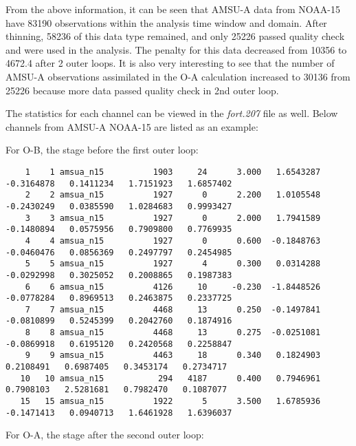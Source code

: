 From the above information, it can be seen that AMSU-A data from NOAA-15 have 83190 observations within the analysis time window and domain.  After thinning, 58236 of this data type remained, and only 25226 passed quality check and were used in the analysis.  The penalty for this data decreased from 10356 to 4672.4 after 2 outer loops. It is also very interesting to see that the number of AMSU-A observations assimilated in the O-A calculation increased to 30136  from 25226 because more data passed quality check in 2nd outer loop.
 
The statistics for each channel can be viewed in the \textit{fort.207} file as well.  Below channels from AMSU-A NOAA-15 are listed as an example:

\hspace{4ex} For O-B, the stage before the first outer loop:

\begin{scriptsize}
\begin{verbatim}
    1    1 amsua_n15          1903     24      3.000   1.6543287  -0.3164878   0.1411234   1.7151923   1.6857402
    2    2 amsua_n15          1927      0      2.200   1.0105548  -0.2430249   0.0385590   1.0284683   0.9993427
    3    3 amsua_n15          1927      0      2.000   1.7941589  -0.1480894   0.0575956   0.7909800   0.7769935
    4    4 amsua_n15          1927      0      0.600  -0.1848763  -0.0460476   0.0856369   0.2497797   0.2454985
    5    5 amsua_n15          1927      4      0.300   0.0314288  -0.0292998   0.3025052   0.2008865   0.1987383
    6    6 amsua_n15          4126     10     -0.230  -1.8448526  -0.0778284   0.8969513   0.2463875   0.2337725
    7    7 amsua_n15          4468     13      0.250  -0.1497841  -0.0810899   0.5245399   0.2042760   0.1874916
    8    8 amsua_n15          4468     13      0.275  -0.0251081  -0.0869918   0.6195120   0.2420568   0.2258847
    9    9 amsua_n15          4463     18      0.340   0.1824903   0.2108491   0.6987405   0.3453174   0.2734717
   10   10 amsua_n15           294   4187      0.400   0.7946961   0.7908103   2.5281681   0.7982470   0.1087077
   15   15 amsua_n15          1922      5      3.500   1.6785936  -0.1471413   0.0940713   1.6461928   1.6396037
\end{verbatim}
\end{scriptsize}

\hspace{4ex} For O-A, the stage after the second outer loop:
 
